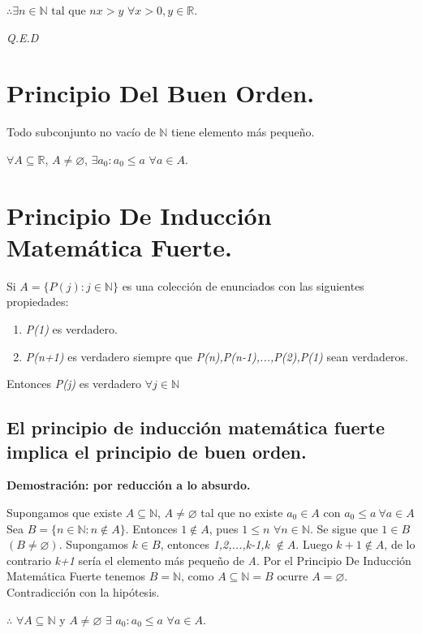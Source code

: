 \documentclass{book}
\begin{document}
$\therefore\exists{n}\in{\mathbb{N}}\mbox{ tal que }nx>y$ $\forall x>0,y\in{\mathbb{R}}$.

\textit{Q.E.D}

\section{Principio Del Buen Orden.}

Todo subconjunto no vacío de $\mathbb{N}$ tiene elemento más pequeño.

$\forall A\subseteq{\mathbb{R}}$, $ A\neq \varnothing$, $\exists a_0 :a_0 \le a$ $ \forall a\in{A}$.

\section{Principio De Inducción Matemática Fuerte.}

Si $A=\lbrace P(j):j\in{\mathbb{N}}\rbrace$ es una colección de enunciados con las siguientes propiedades:
\begin{enumerate}[1.]
\item \textit{P(1)} es verdadero.
\item \textit{P(n+1)} es verdadero siempre que \textit{P(n),P(n-1),...,P(2),P(1)} sean verdaderos.
\end{enumerate}
Entonces \textit{P(j)} es verdadero $\forall j\in{\mathbb{N}}$

\subsection{El principio de inducción matemática fuerte implica el principio de buen orden.}

\textbf{Demostración: por reducción a lo absurdo.}

Supongamos que existe $A\subseteq \mathbb{N}$, $A\neq \varnothing$ tal que no existe $a_0\in A\mbox{ con }a_0\le{a} \ \forall a\in{A}$
Sea $B=\lbrace n\in{\mathbb{N}}:n\notin{A} \rbrace$. Entonces $1\notin{A}$, pues $ 1\le{n}$ $\forall{n\in{\mathbb{N}}}$.
Se sigue que $1\in{B}$ $(B\neq \varnothing)$.
Supongamos $k\in{B}$, entonces \textit{1,2,...,k-1,k} $\notin{A}$.
Luego $k+1\notin{A}$, de lo contrario \textit{k+1} sería el elemento más pequeño de \textit{A}.
Por el Principio De Inducción Matemática Fuerte tenemos $B=\mathbb{N}\mbox{, como }A\subseteq{\mathbb{N}}=B\mbox{ ocurre }A=\varnothing$.
Contradicción con la hipótesis.

$\therefore$ $\forall A\subseteq{\mathbb{N}}$ y $A\neq{\varnothing}$ $\exists$ $a_0:a_0\le{a}$ $\forall{a\in{A}}$.
\end{document}
